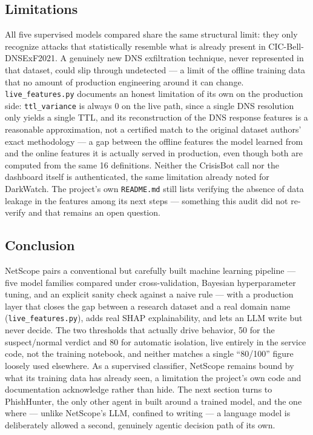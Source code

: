 \subsection*{Limitations}
All five supervised models compared share the same structural limit: they
only recognize attacks that statistically resemble what is already present
in CIC-Bell-DNSExF2021. A genuinely new DNS exfiltration technique, never
represented in that dataset, could slip through undetected --- a limit of
the offline training data that no amount of production engineering around
it can change. \texttt{live\_features.py} documents an honest limitation of
its own on the production side: \texttt{ttl\_variance} is always 0 on the
live path, since a single DNS resolution only yields a single TTL, and its
reconstruction of the DNS response features is a reasonable approximation,
not a certified match to the original dataset authors' exact methodology
--- a gap between the offline features the model learned from and the
online features it is actually served in production, even though both are
computed from the same 16 definitions. Neither the CrisisBot call nor the
dashboard itself is authenticated, the same limitation already noted for
DarkWatch. The project's own \texttt{README.md} still lists verifying the
absence of data leakage in the features among its next steps --- something
this audit did not re-verify and that remains an open question.

\subsection*{Conclusion}
NetScope pairs a conventional but carefully built machine learning pipeline
--- five model families compared under cross-validation, Bayesian
hyperparameter tuning, and an explicit sanity check against a naive rule
--- with a production layer that closes the gap between a research dataset
and a real domain name (\texttt{live\_features.py}), adds real SHAP
explainability, and lets an LLM write but never decide. The two thresholds
that actually drive behavior, 50 for the suspect/normal verdict and 80 for
automatic isolation, live entirely in the service code, not the training
notebook, and neither matches a single ``80/100'' figure loosely used
elsewhere. As a supervised classifier, NetScope remains bound by what its
training data has already seen, a limitation the project's own code and
documentation acknowledge rather than hide. The next section turns to
PhishHunter, the only other agent in \ProjectName{} built around a trained
model, and the one where --- unlike NetScope's LLM, confined to writing ---
a language model is deliberately allowed a second, genuinely agentic
decision path of its own.
